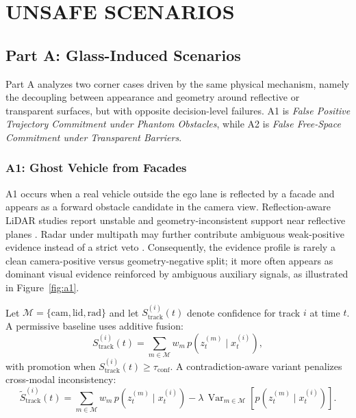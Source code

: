 \documentclass[sigconf,nonacm]{acmart}
\DeclareMathOperator{\Var}{Var}
\begin{document}
\section{UNSAFE SCENARIOS}

\subsection{Part A: Glass-Induced Scenarios}

Part A analyzes two corner cases driven by the same physical mechanism, namely the decoupling between appearance and geometry around reflective or transparent surfaces, but with opposite decision-level failures. A1 is \textit{False Positive Trajectory Commitment under Phantom Obstacles}, while A2 is \textit{False Free-Space Commitment under Transparent Barriers}.

\subsubsection{A1: Ghost Vehicle from Facades}

A1 occurs when a real vehicle outside the ego lane is reflected by a facade and appears as a forward obstacle candidate in the camera view. Reflection-aware LiDAR studies report unstable and geometry-inconsistent support near reflective planes \cite{zhao2024ref,li2024plane}. Radar under multipath may further contribute ambiguous weak-positive evidence instead of a strict veto \cite{zheng2024radar}. Consequently, the evidence profile is rarely a clean camera-positive versus geometry-negative split; it more often appears as dominant visual evidence reinforced by ambiguous auxiliary signals, as illustrated in Figure~\ref{fig:a1}.

Let $\mathcal{M}=\{\mathrm{cam},\mathrm{lid},\mathrm{rad}\}$ and let $S_{\mathrm{track}}^{(i)}(t)$ denote confidence for track $i$ at time $t$. A permissive baseline uses additive fusion:
\begin{equation}
S_{\mathrm{track}}^{(i)}(t)=\sum_{m\in\mathcal{M}} w_m\, p\!\left(z_t^{(m)}\mid x_t^{(i)}\right),
\label{eq:a1_baseline}
\end{equation}
with promotion when $S_{\mathrm{track}}^{(i)}(t)\ge \tau_{\mathrm{conf}}$. A contradiction-aware variant penalizes cross-modal inconsistency:
\begin{equation}
\tilde{S}_{\mathrm{track}}^{(i)}(t)=\sum_{m\in\mathcal{M}} w_m\, p\!\left(z_t^{(m)}\mid x_t^{(i)}\right)
-\lambda\,\Var_{m\in\mathcal{M}}\!\left[p\!\left(z_t^{(m)}\mid x_t^{(i)}\right)\right].
\label{eq:a1_penalized}
\end{equation}
\end{document}
